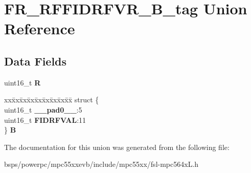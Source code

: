 \hypertarget{unionFR__RFFIDRFVR__16B__tag}{}\section{F\+R\+\_\+\+R\+F\+F\+I\+D\+R\+F\+V\+R\+\_\+B\+\_\+tag Union Reference}
\label{unionFR__RFFIDRFVR__16B__tag}
\subsection*{Data Fields}
\begin{DoxyCompactItemize}
\item 
\mbox{\label{unionFR__RFFIDRFVR__16B__tag_a7b84e091639ef5bb059cd7938dfbd1b6}} 
uint16\+\_\+t {\bfseries R}
\item 
\mbox{\label{unionFR__RFFIDRFVR__16B__tag_a424b6b5098396882de2180a4b25d99b3}} 
\begin{tabbing}
xx\=xx\=xx\=xx\=xx\=xx\=xx\=xx\=xx\=\kill
struct \{\\
\>uint16\_t {\bfseries \_\_pad0\_\_}:5\\
\>uint16\_t {\bfseries FIDRFVAL}:11\\
\} {\bfseries B}\\

\end{tabbing}\end{DoxyCompactItemize}


The documentation for this union was generated from the following file\+:\begin{DoxyCompactItemize}
\item 
bsps/powerpc/mpc55xxevb/include/mpc55xx/fsl-\/mpc564x\+L.\+h\end{DoxyCompactItemize}
